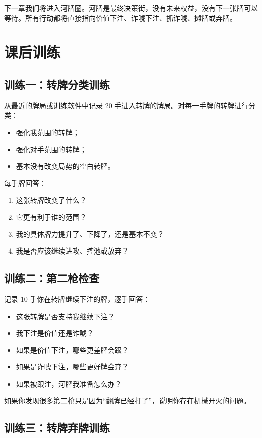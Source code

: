 下一章我们将进入河牌圈。河牌是最终决策街，没有未来权益，没有下一张牌可以等待。所有行动都将直接指向价值下注、诈唬下注、抓诈唬、摊牌或弃牌。

\section{课后训练}

\subsection*{训练一：转牌分类训练}

从最近的牌局或训练软件中记录 20 手进入转牌的牌局。对每一手牌的转牌进行分类：

\begin{itemize}
\item 强化我范围的转牌；
\item 强化对手范围的转牌；
\item 基本没有改变局势的空白转牌。
\end{itemize}

每手牌回答：

\begin{enumerate}
\item 这张转牌改变了什么？
\item 它更有利于谁的范围？
\item 我的具体牌力提升了、下降了，还是基本不变？
\item 我是否应该继续进攻、控池或放弃？
\end{enumerate}

\subsection*{训练二：第二枪检查}

记录 10 手你在转牌继续下注的牌，逐手回答：

\begin{itemize}
\item 这张转牌是否支持我继续下注？
\item 我下注是价值还是诈唬？
\item 如果是价值下注，哪些更差牌会跟？
\item 如果是诈唬下注，哪些更好牌会弃？
\item 如果被跟注，河牌我准备怎么办？
\end{itemize}

如果你发现很多第二枪只是因为“翻牌已经打了”，说明你存在机械开火的问题。

\subsection*{训练三：转牌弃牌训练}

